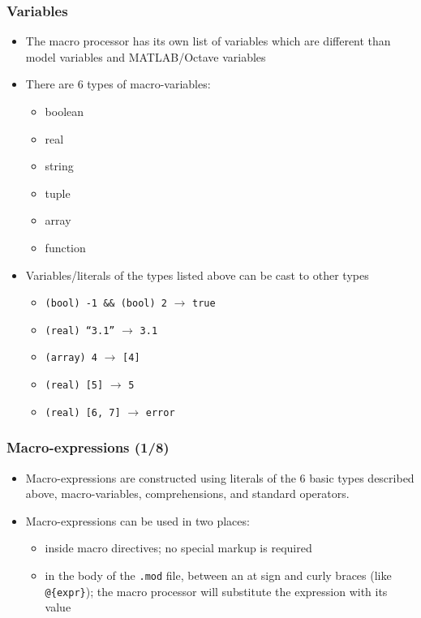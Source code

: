 \documentclass{beamer}
\begin{document}
\begin{frame}
\frametitle{Variables}
\begin{itemize}
\item The macro processor has its own list of variables which are different than model variables and MATLAB/Octave variables
\item There are 6 types of macro-variables:
  \begin{itemize}
  \item boolean
  \item real
  \item string
  \item tuple
  \item array
  \item function
  \end{itemize}
\item Variables/literals of the types listed above can be cast to other types
  \begin{itemize}
  \item \texttt{(bool) -1 \&\& (bool) 2} $\rightarrow$ \texttt{true}
  \item \texttt{(real) ``3.1''} $\rightarrow$ \texttt{3.1}
  \item \texttt{(array) 4} $\rightarrow$ \texttt{[4]}
  \item \texttt{(real) [5]} $\rightarrow$ \texttt{5}
  \item \texttt{(real) [6, 7]} $\rightarrow$ \texttt{error}
  \end{itemize}
\end{itemize}
\end{frame}

\begin{frame}[fragile=singleslide]
  \frametitle{Macro-expressions (1/8)}
  \begin{itemize}
    \item Macro-expressions are constructed using literals of the 6 basic types
      described above, macro-variables, comprehensions, and standard operators.
    \item Macro-expressions can be used in two places:
      \begin{itemize}
      \item inside macro directives; no special markup is required
      \item in the body of the \texttt{.mod} file, between an at sign and curly braces (like \verb+@{expr}+); the macro processor will substitute the expression with its value
      \end{itemize}
  \end{itemize}
\end{frame}
\end{document}
